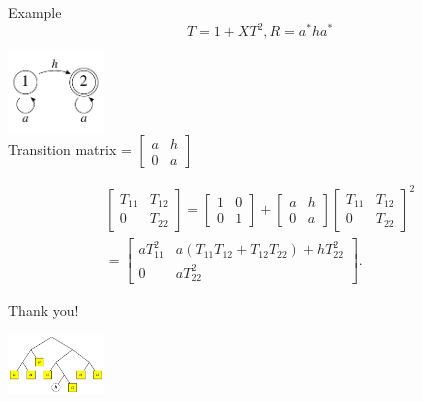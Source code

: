 \documentclass[xcolor=svgnames,12pt]{beamer}
\newenvironment{xframe}[1][]
  {\begin{frame}[fragile,environment=xframe,#1]}
  {\end{frame}}
\begin{document}
\begin{xframe}{Example}
  \[ T = 1 + XT^2, R = a^*ha^* \]
  \begin{center}
  \includegraphics[width=1in]{deriv-DFA} \\
  Transition matrix = $\begin{bmatrix}
    a & h \\ 0 & a
  \end{bmatrix}$

  \begin{multline*}
  \begin{bmatrix}
    T_{11} & T_{12} \\
    0 & T_{22}
  \end{bmatrix}
  =
  \begin{bmatrix}
    1 & 0 \\
    0 & 1
  \end{bmatrix}
  +
  \begin{bmatrix}
    a & h \\
    0 & a
  \end{bmatrix}
  \begin{bmatrix}
    T_{11} & T_{12} \\
    0 & T_{22}
  \end{bmatrix}^2
  \\
  =
  \begin{bmatrix}
    a T_{11}^2 & a(T_{11}T_{12} + T_{12}T_{22}) + hT_{22}^2 \\
    0 & a T_{22}^2
  \end{bmatrix}.
  \end{multline*}
  \end{center}
\end{xframe}

\begin{xframe}
  \begin{center}
    Thank you! \bigskip

    \includegraphics[width=1in]{deriv-tree}

  \end{center}
\end{xframe}
\end{document}
